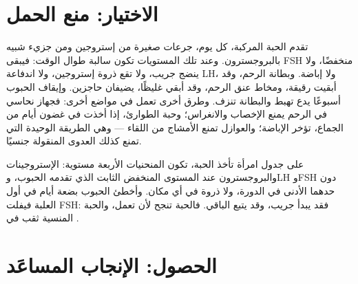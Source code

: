 \section{الاختيار: منع الحمل}

\begin{proposition}\label{prop:g11:hormones-and-reproduction:contraception}
تقدم الحبة المركبة، كل يوم، جرعات صغيرة من إستروجين ومن جزيء شبيه
بالبروجسترون. وعند تلك المستويات تكون  سالبة طوال
الوقت: فيبقى FSH منخفضًا، ولا ينضج جريب، ولا تقع ذروة إستروجين، ولا
اندفاعة LH، ولا إباضة. وبطانة الرحم، وقد أبقيت رقيقة، ومخاط عنق الرحم،
وقد أبقي غليظًا، يضيفان حاجزين. وإيقاف الحبوب أسبوعًا يدع 
تهبط والبطانة تنزف. وطرق أخرى تعمل في مواضع أخرى: فجهاز نحاسي في الرحم
يمنع الإخصاب والانغراس؛ وحبة الطوارئ، إذا أخذت في غضون أيام من الجماع،
تؤخر الإباضة؛ والعوازل تمنع الأمشاج من اللقاء --- وهي الطريقة الوحيدة
التي تمنع كذلك العدوى المنقولة جنسيًا.
\end{proposition}
\admitted

\begin{example}\label{ex:g11:hormones-and-reproduction:pill}
على جدول امرأة تأخذ الحبة، تكون المنحنيات الأربعة مستوية:
الإستروجينات والبروجسترون عند المستوى المنخفض الثابت الذي تقدمه
الحبوب، وLH وFSH دون حدهما الأدنى في الدورة، ولا ذروة في أي مكان.
وأخطئ الحبوب بضعة أيام في أول العلبة فيفلت FSH: فقد يبدأ جريب، وقد
يتبع الباقي. فالحبة تنجح لأن  تعمل، والحبة المنسية ثقب
في .
\end{example}

\section{الحصول: الإنجاب المساعَد}

